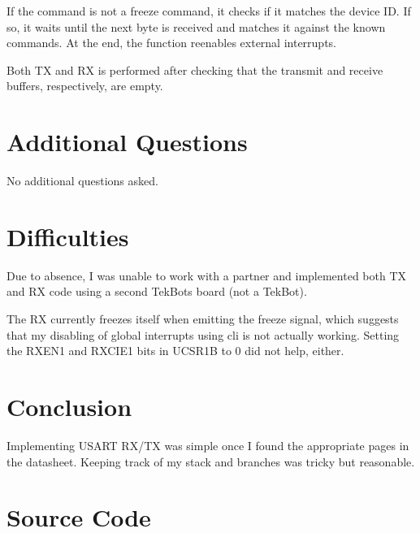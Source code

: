 \documentclass[12pt,letterpaper]{article}
\begin{document}
If the command is not a freeze command, it checks if it matches the device ID.
If so, it waits until the next byte is received and matches it against the
known commands. At the end, the function reenables external interrupts.

Both TX and RX is performed after checking that the transmit and receive
buffers, respectively, are empty.


\section*{Additional Questions}

No additional questions asked.


\section*{Difficulties}

Due to absence, I was unable to work with a partner and implemented both TX and
RX code using a second TekBots board (not a TekBot).

The RX currently freezes itself when emitting the freeze signal, which suggests
that my disabling of global interrupts using cli is not actually working.
Setting the RXEN1 and RXCIE1 bits in UCSR1B to 0 did not help, either.


\section*{Conclusion}

Implementing USART RX/TX was simple once I found the appropriate pages in the
datasheet. Keeping track of my stack and branches was tricky but reasonable.


\section*{Source Code}



\end{document}
